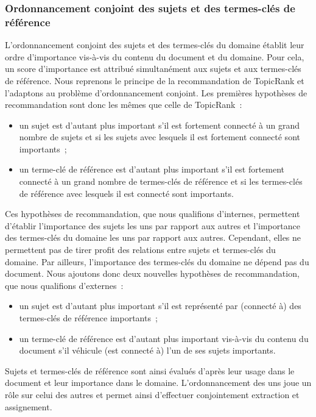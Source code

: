       \subsubsection{Ordonnancement conjoint des sujets et des termes-clés de référence}
      \label{subsubsec:main-domain_specific_keyphrase_annotation-supervised_automatic_keyphrase_extraction-topiccorank-co_ranking}
        L'ordonnancement conjoint des sujets et des termes-clés du domaine
        établit leur ordre d'importance vis-à-vis du contenu du document et du
        domaine. Pour cela, un score d'importance est attribué simultanément aux
        sujets et aux termes-clés de référence.
%
        Nous reprenons le principe de la recommandation de TopicRank et
        l'adaptons au problème d'ordonnancement conjoint. Les premières
        hypothèses de recommandation sont donc les mêmes que celle de
        TopicRank~:
        \begin{itemize}
          \item{un sujet est d'autant plus important s'il est fortement connecté
                à un grand nombre de sujets et si les sujets avec lesquels il
                est fortement connecté sont importants~;}
          \item{un terme-clé de référence est d'autant plus important s'il est
                fortement connecté à un grand nombre de termes-clés de référence
                et si les termes-clés de référence avec lesquels il est connecté
                sont importants.}
        \end{itemize}
        Ces hypothèses de recommandation, que nous qualifions d'internes,
        permettent d'établir l'importance des sujets les uns par rapport aux
        autres et l'importance des termes-clés du domaine les uns par rapport
        aux autres. Cependant, elles ne permettent pas de tirer profit des
        relations entre sujets et termes-clés du domaine. Par ailleurs,
        l'importance des termes-clés du domaine ne  dépend pas du document. Nous
        ajoutons donc deux nouvelles hypothèses de recommandation, que nous
        qualifions d'externes~:
        \begin{itemize}
          \item{un sujet est d'autant plus important s'il est représenté par
                (connecté à) des termes-clés de référence importants~;}
          \item{un terme-clé de référence est d'autant plus important vis-à-vis
                du contenu du document s'il véhicule (est connecté à) l'un de
                ses sujets importants.}
        \end{itemize}
        Sujets et termes-clés de référence sont ainsi évalués d'après leur usage
        dans le document et leur importance dans le domaine. L'ordonnancement
        des uns joue un rôle sur celui des autres et permet ainsi d'effectuer
        conjointement extraction et assignement.

